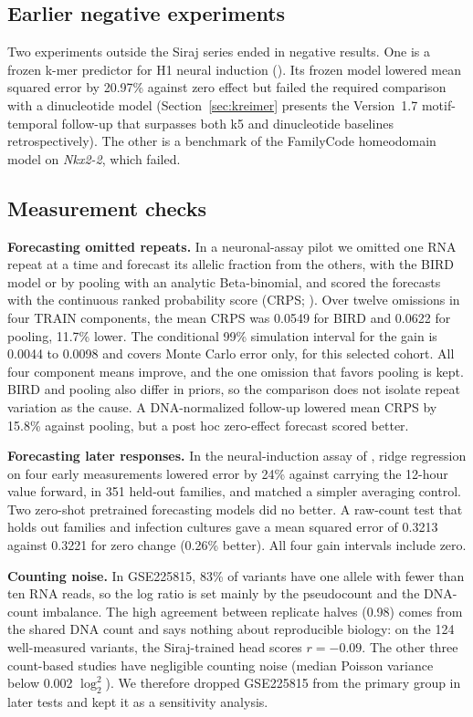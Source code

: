 \documentclass[10.5pt,a4paper]{article}
\begin{document}
\subsection{Earlier negative experiments}

Two experiments outside the Siraj series ended in negative results. One is a frozen k-mer predictor for H1 neural induction (). Its frozen model lowered mean squared error by 20.97\% against zero effect but failed the required comparison with a dinucleotide model (Section~\ref{sec:kreimer} presents the Version~1.7 motif-temporal follow-up that surpasses both k5 and dinucleotide baselines retrospectively). The other is a benchmark of the FamilyCode homeodomain model \citep{liu2025} on \emph{Nkx2-2}, which failed.

\subsection{Measurement checks}

\textbf{Forecasting omitted repeats.} In a neuronal-assay pilot we omitted one RNA repeat at a time and forecast its allelic fraction from the others, with the BIRD model \citep{majoros2020} or by pooling with an analytic Beta-binomial, and scored the forecasts with the continuous ranked probability score (CRPS; \citealt{gneiting2007}). Over twelve omissions in four TRAIN components, the mean CRPS was 0.0549 for BIRD and 0.0622 for pooling, 11.7\% lower. The conditional 99\% simulation interval for the gain is 0.0044 to 0.0098 and covers Monte Carlo error only, for this selected cohort. All four component means improve, and the one omission that favors pooling is kept. BIRD and pooling also differ in priors, so the comparison does not isolate repeat variation as the cause. A DNA-normalized follow-up lowered mean CRPS by 15.8\% against pooling, but a post hoc zero-effect forecast scored better.

\textbf{Forecasting later responses.} In the neural-induction assay of \citet{kreimer2022}, ridge regression on four early measurements lowered error by 24\% against carrying the 12-hour value forward, in 351 held-out families, and matched a simpler averaging control. Two zero-shot pretrained forecasting models did no better. A raw-count test that holds out families and infection cultures gave a mean squared error of 0.3213 against 0.3221 for zero change (0.26\% better). All four gain intervals include zero.

\textbf{Counting noise.} In GSE225815, 83\% of variants have one allele with fewer than ten RNA reads, so the log ratio is set mainly by the pseudocount and the DNA-count imbalance. The high agreement between replicate halves (0.98) comes from the shared DNA count and says nothing about reproducible biology: on the 124 well-measured variants, the Siraj-trained head scores $r=-0.09$. The other three count-based studies have negligible counting noise (median Poisson variance below 0.002 $\log_2^2$). We therefore dropped GSE225815 from the primary group in later tests and kept it as a sensitivity analysis.
\end{document}

